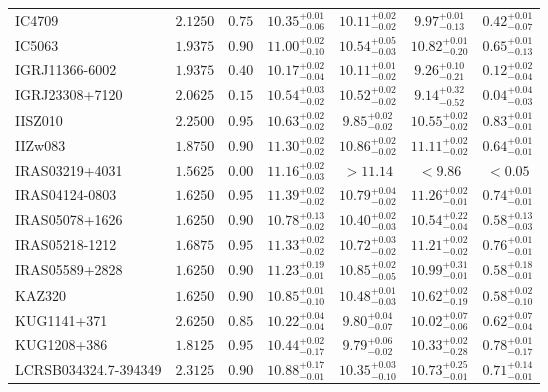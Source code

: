 \documentclass[onecolumn]{mn2e}
\begin{document}
{\begin{center}
\begin{longtable}{lcccccc}
IC4709 & $2.1250$ & $0.75$ & $10.35_{-0.06}^{+0.01}$ & $10.11_{-0.02}^{+0.02}$ & $9.97_{-0.13}^{+0.01}$ &$0.42_{-0.07}^{+0.01}$ \\
IC5063 & $1.9375$ & $0.90$ & $11.00_{-0.10}^{+0.02}$ & $10.54_{-0.03}^{+0.05}$ & $10.82_{-0.20}^{+0.01}$ &$0.65_{-0.13}^{+0.01}$ \\
IGRJ11366-6002 & $1.9375$ & $0.40$ & $10.17_{-0.04}^{+0.02}$ & $10.11_{-0.02}^{+0.01}$ & $9.26_{-0.21}^{+0.10}$ &$0.12_{-0.04}^{+0.02}$ \\
IGRJ23308+7120 & $2.0625$ & $0.15$ & $10.54_{-0.02}^{+0.03}$ & $10.52_{-0.02}^{+0.02}$ & $9.14_{-0.52}^{+0.32}$ &$0.04_{-0.03}^{+0.04}$ \\
IISZ010 & $2.2500$ & $0.95$ & $10.63_{-0.02}^{+0.02}$ & $9.85_{-0.02}^{+0.02}$ & $10.55_{-0.02}^{+0.02}$ &$0.83_{-0.01}^{+0.01}$ \\
IIZw083 & $1.8750$ & $0.90$ & $11.30_{-0.02}^{+0.02}$ & $10.86_{-0.02}^{+0.02}$ & $11.11_{-0.02}^{+0.02}$ &$0.64_{-0.01}^{+0.01}$ \\
IRAS03219+4031 & $1.5625$ & $0.00$ & $11.16_{-0.03}^{+0.02}$ & $>11.14$ & $<9.86$ &$<0.05$ \\
IRAS04124-0803 & $1.6250$ & $0.95$ & $11.39_{-0.02}^{+0.02}$ & $10.79_{-0.02}^{+0.04}$ & $11.26_{-0.01}^{+0.02}$ &$0.74_{-0.01}^{+0.01}$ \\
IRAS05078+1626 & $1.6250$ & $0.90$ & $10.78_{-0.02}^{+0.13}$ & $10.40_{-0.03}^{+0.02}$ & $10.54_{-0.04}^{+0.22}$ &$0.58_{-0.03}^{+0.13}$ \\
IRAS05218-1212 & $1.6875$ & $0.95$ & $11.33_{-0.02}^{+0.02}$ & $10.72_{-0.02}^{+0.03}$ & $11.21_{-0.02}^{+0.02}$ &$0.76_{-0.01}^{+0.01}$ \\
IRAS05589+2828 & $1.6250$ & $0.90$ & $11.23_{-0.01}^{+0.19}$ & $10.85_{-0.05}^{+0.02}$ & $10.99_{-0.01}^{+0.31}$ &$0.58_{-0.01}^{+0.18}$ \\
KAZ320 & $1.6250$ & $0.90$ & $10.85_{-0.10}^{+0.01}$ & $10.48_{-0.03}^{+0.01}$ & $10.62_{-0.19}^{+0.02}$ &$0.58_{-0.10}^{+0.02}$ \\
KUG1141+371 & $2.6250$ & $0.85$ & $10.22_{-0.04}^{+0.04}$ & $9.80_{-0.07}^{+0.04}$ & $10.02_{-0.06}^{+0.07}$ &$0.62_{-0.04}^{+0.07}$ \\
KUG1208+386 & $1.8125$ & $0.95$ & $10.44_{-0.17}^{+0.02}$ & $9.79_{-0.02}^{+0.06}$ & $10.33_{-0.28}^{+0.02}$ &$0.78_{-0.17}^{+0.01}$ \\
LCRSB034324.7-394349 & $2.3125$ & $0.90$ & $10.88_{-0.01}^{+0.17}$ & $10.35_{-0.10}^{+0.03}$ & $10.73_{-0.01}^{+0.25}$ &$0.71_{-0.01}^{+0.14}$ \\

\end{longtable}
\end{center}}
\end{document}
